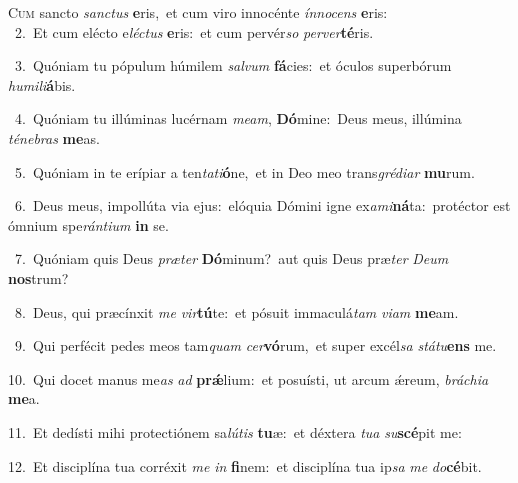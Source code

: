 \lettrine{\initial\textcolor{\initialcolor}{C}}{um} sancto \textit{sanc}\-\textit{tus} \textbf{e}\-ris,~\star et cum viro innocénte \textit{ín}\-\textit{no}\textit{cens} \textbf{e}\-ris:\\
{\numbfont\textcolor{\numbcolor}{~2.}}~Et cum elécto e\-\textit{léc}\-\textit{tus} \textbf{e}\-ris:~\star et cum pervér\textit{so} \textit{per}\-\textit{ver}\textbf{té}ris.\par
{\numbfont\textcolor{\numbcolor}{~3.}}~Quóniam tu pópulum húmilem \textit{sal}\-\textit{vum} \textbf{fá}\-cies:~\star et óculos superbórum \textit{hu}\-\textit{mi}\textit{li}\textbf{á}bis.\par
{\numbfont\textcolor{\numbcolor}{~4.}}~Quóniam tu illúminas lucérnam \textit{me}\-\textit{am}, \textbf{Dó}\-mine:~\star Deus meus, illúmina \textit{té}\-\textit{ne}\textit{bras} \textbf{me}\-as.\par
{\numbfont\textcolor{\numbcolor}{~5.}}~Quóniam in te erípiar a ten\-\textit{ta}\-\textit{ti}\textbf{ó}ne,~\star et in Deo meo trans\-\textit{gré}\-\textit{di}\textit{ar} \textbf{mu}\-rum.\par
{\numbfont\textcolor{\numbcolor}{~6.}}~Deus meus, impollúta via ejus:~\dagger elóquia Dómini igne ex\-\textit{a}\-\textit{mi}\textbf{ná}ta:~\star protéctor est ómnium spe\-\textit{rán}\-\textit{ti}\textit{um} \textbf{in} se.\par
{\numbfont\textcolor{\numbcolor}{~7.}}~Quóniam quis Deus \textit{præ}\-\textit{ter} \textbf{Dó}\-minum?~\star aut quis Deus præ\textit{ter} \textit{De}\-\textit{um} \textbf{nos}\-trum?\par
{\numbfont\textcolor{\numbcolor}{~8.}}~Deus, qui præcínxit \textit{me} \textit{vir}\-\textbf{tú}te:~\star et pósuit immaculá\textit{tam} \textit{vi}\-\textit{am} \textbf{me}\-am.\par
{\numbfont\textcolor{\numbcolor}{~9.}}~Qui perfécit pedes meos tam\textit{quam} \textit{cer}\-\textbf{vó}rum,~\star et super excél\textit{sa} \textit{stá}\-\textit{tu}\textbf{ens} me.\par
{\numbfont\textcolor{\numbcolor}{10.}}~Qui docet manus me\textit{as} \textit{ad} \textbf{prǽ}\-lium:~\star et posuísti, ut arcum ǽreum, \textit{brá}\-\textit{chi}\textit{a} \textbf{me}\-a.\par
{\numbfont\textcolor{\numbcolor}{11.}}~Et dedísti mihi protectiónem sa\-\textit{lú}\-\textit{tis} \textbf{tu}\-æ:~\star et déxtera \textit{tu}\-\textit{a} \textit{su}\-\textbf{scé}pit me:\par
{\numbfont\textcolor{\numbcolor}{12.}}~Et disciplína tua corréxit \textit{me} \textit{in} \textbf{fi}\-nem:~\star et disciplína tua ip\textit{sa} \textit{me} \textit{do}\-\textbf{cé}bit.\par

